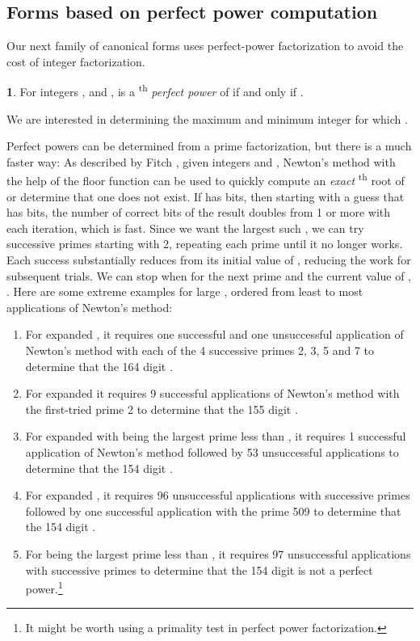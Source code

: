 \documentclass[12pt,english]{article}
\theoremstyle{definition}
\newtheorem*{defn*}{\protect\definitionname}
\theoremstyle{remark}
\theoremstyle{plain}
\theoremstyle{plain}
\providecommand{\definitionname}{Definition}
\begin{document}
\subsection{Forms based on perfect power computation}

Our next family of canonical forms uses perfect-power factorization
to avoid the cost of integer factorization.
\begin{defn*}
For integers ,  and ,  is a \textsuperscript{th}
\textsl{perfect power} of  if and only if .
\end{defn*}
We are interested in determining the maximum  and minimum
integer  for which .

Perfect powers can be determined from a prime factorization, but there
is a much faster way: As described by Fitch \cite{FitchNewtonNthRootOfInteger},
given integers  and , Newton's method with the help of
the floor function can be used to quickly compute an \textsl{exact}
\textsuperscript{th} root of  or determine that one does
not exist. If  has  bits, then starting with a guess that
has  bits, the number of correct bits
of the result doubles from 1 or more with each iteration, which is
fast. Since we want the largest such , we can try successive primes
starting with 2, repeating each prime until it no longer works. Each
success substantially reduces  from its initial value of ,
reducing the work for subsequent trials. We can stop when for the
next prime  and the current value of , . Here are
some extreme examples for large \textsl{}, ordered from least
to most applications of Newton's method:
\begin{enumerate}
\item For expanded , it requires one successful
and one unsuccessful application of Newton's method with each of the
4 successive primes 2, 3, 5 and 7 to determine that the 164 digit
.
\item For expanded  it requires 9 successful applications
of Newton's method with the first-tried prime 2 to determine that
the 155 digit .
\item For expanded  with  being the largest prime less than
, it requires 1 successful application of Newton's method
followed by 53 unsuccessful applications to determine that the 154
digit .
\item For expanded , it requires 96 unsuccessful applications
with successive primes followed by one successful application with
the prime 509 to determine that the 154 digit .
\item For  being the largest prime less than , it requires
97 unsuccessful applications with successive primes to determine that
the 154 digit  is not a perfect power.\footnote{It might be worth using a primality test in perfect power factorization.}
\end{enumerate}
\end{document}
